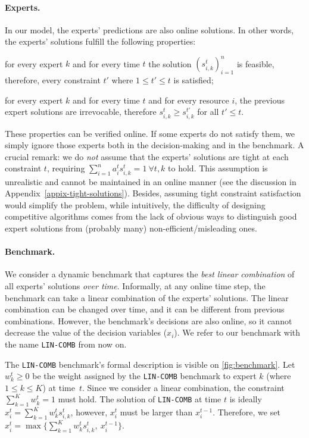 \paragraph{Experts.} \label{subsec:experts} In our model, the experts' predictions are also online solutions. In other words, the experts' solutions
fulfill the following properties:
\begin{compactenum}
	\item for every expert $k$ and for every time $t$ the solution $(s_{i,k}^{t})_{i=1}^{n}$ is feasible, therefore, every constraint $t'$ where $1 \leq t' \leq t$ is satisfied;
	\item for every expert $k$ and for every time $t$ and for every resource $i$, the previous expert solutions are irrevocable, therefore $s_{i,k}^{t} \geq s_{i,k}^{t'}$ for all $t' \leq t$.
\end{compactenum}
These properties can be verified online. If some experts do not satisfy them, we simply ignore those experts both in the decision-making and in the benchmark.
A crucial remark: we do \emph{not} assume that the experts' solutions are tight at each constraint $t$, requiring $\sum_{i=1}^{n} a_{i}^{t} s_{i,k}^{t} = 1 ~ \forall t, k$ to hold.
This assumption is unrealistic and cannot be maintained in an online manner (see the discussion in Appendix~\ref{appix-tight-solutions}).
Besides, assuming tight constraint satisfaction would simplify the problem, while intuitively,
the difficulty of designing competitive algorithms comes from the lack of obvious ways to distinguish
good expert solutions from (probably many) non-efficient/misleading ones.

\paragraph{Benchmark.}
We consider a dynamic benchmark that captures the \emph{best linear combination} of all experts' solutions \emph{over time}.
Informally, at any online time step, the benchmark can take a linear combination of the experts' solutions.
The linear combination can be changed over time, and it can be different from previous combinations.
However, the benchmark's decisions are also online, so it cannot decrease the value of the decision variables ($x_{i}$).
We refer to our benchmark with the name \texttt{LIN-COMB} from now on.

The \texttt{LIN-COMB} benchmark's formal description is visible on \cref{fig:benchmark}.
Let $w_{k}^{t} \geq 0$ be the weight assigned by the \texttt{LIN-COMB} benchmark to expert $k$ (where $1 \leq k \leq K$) at time~$t$.
Since we consider a linear combination, the constraint $ \sum_{k=1}^{K} w_{k}^{t} = 1$ must hold.
The solution of \texttt{LIN-COMB} at time $t$ is ideally $x_{i}^{t} = \sum_{k=1}^{K} w_{k}^{t} s_{i,k}^{t}$,
however, $x_{i}^{t}$ must be larger than $x_{i}^{t-1}$.
Therefore, we set $x_{i}^{t} = \max\bigl\{\sum_{k=1}^{K} w_{k}^{t} s_{i,k}^{t},\ x_{i}^{t-1}\bigr\}$.

